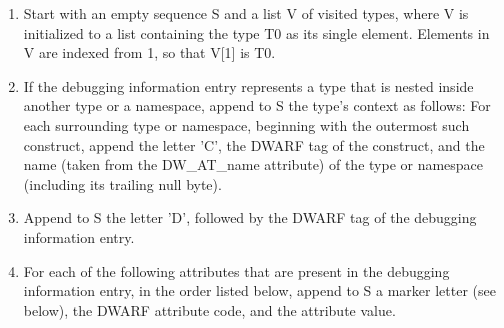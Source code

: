 \begin{enumerate}[1.]

\item Start with an empty sequence S and a list V of visited
types, where V is initialized to a list containing the type
T0 as its single element. Elements in V are indexed from 1,
so that V[1] is T0.

\item If the debugging information entry represents a type that
is nested inside another type or a namespace, append to S
the type’s context as follows: For each surrounding type
or namespace, beginning with the outermost such construct,
append the letter 'C', the DWARF tag of the construct, and
the name (taken from the DW\_AT\_name attribute) of the type
or namespace (including its trailing null byte).

\item  Append to S the letter 'D', followed by the DWARF tag of
the debugging information entry.

\item For each of the following attributes that are present in
the debugging information entry, in the order listed below,
append to S a marker letter (see below), the DWARF attribute
code, and the attribute value.


\end{enumerate}
